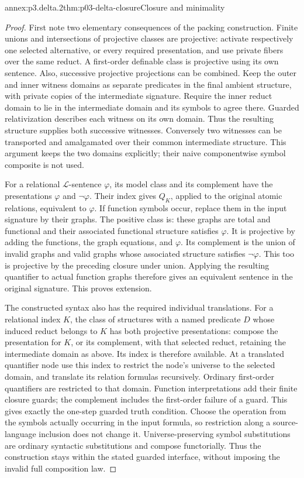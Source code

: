 \begin{annexitem}{annex:p3.delta.2}{thm:p03-delta-closure}{Closure and minimality}
\begin{proof}
First note two elementary consequences of the packing construction.
Finite unions and intersections of projective classes are projective:
activate respectively one selected alternative, or every required
presentation, and use private fibers over the same reduct. A
first-order definable class is projective using its own sentence.
Also, successive projective projections can be combined. Keep the
outer and inner witness domains as separate predicates in the final
ambient structure, with private copies of the intermediate signature.
Require the inner reduct domain to lie in the intermediate domain and
its symbols to agree there. Guarded relativization describes each
witness on its own domain. Thus the resulting structure supplies both
successive witnesses. Conversely two witnesses can be transported and
amalgamated over their common intermediate structure. This argument
keeps the two domains explicitly; their naive componentwise symbol
composite is not used.

For a relational \(\mathcal L\)-sentence \(\varphi\), its model
class and its complement have the presentations \(\varphi\) and
\(\neg\varphi\). Their index gives \(Q_K\), applied to the original
atomic relations, equivalent to \(\varphi\). If function symbols
occur, replace them in the input signature by their graphs. The
positive class is: these graphs are total and functional and their
associated functional structure satisfies \(\varphi\). It is
projective by adding the functions, the graph equations, and
\(\varphi\). Its complement is the union of invalid graphs and
valid graphs whose associated structure satisfies \(\neg\varphi\).
This too is projective by the preceding closure under union. Applying
the resulting quantifier to actual function graphs therefore gives an
equivalent sentence in the original signature. This proves extension.

The constructed syntax also has the required individual translations.
For a relational index \(K\), the class of structures with a named
predicate \(D\) whose induced reduct belongs to \(K\) has both
projective presentations: compose the presentation for \(K\), or
its complement, with that selected reduct, retaining the intermediate
domain as above. Its index is therefore available. At a translated
quantifier node use this index to restrict the node's universe to the
selected domain, and translate its relation formulas recursively.
Ordinary first-order quantifiers are restricted to that domain.
Function interpretations add their finite closure guards; the
complement includes the first-order failure of a guard. This gives
exactly the one-step guarded truth condition. Choose the operation
from the symbols actually occurring in the input formula, so
restriction along a source-language inclusion does not change it.
Universe-preserving symbol substitutions are ordinary syntactic
substitutions and compose functorially. Thus the construction stays
within the stated guarded interface, without imposing the invalid
full composition law.


\end{proof}
\end{annexitem}

